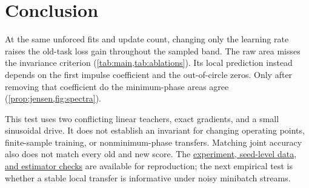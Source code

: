 \section{Conclusion}

At the same unforced fits and update count, changing only the learning rate raises the old-task loss gain throughout the sampled band. The raw area misses the invariance criterion (\cref{tab:main,tab:ablations}). Its local prediction instead depends on the first impulse coefficient and the out-of-circle zeros. Only after removing that coefficient do the minimum-phase areas agree (\cref{prop:jensen,fig:spectra}).

This test uses two conflicting linear teachers, exact gradients, and a small sinusoidal drive. It does not establish an invariant for changing operating points, finite-sample training, or nonminimum-phase transfers. Matching joint accuracy also does not match every old and new score. The \href{https://github.com/manojbajaj95/cl/tree/f018cf8/experiments/waterbed}{experiment, seed-level data, and estimator checks} are available for reproduction; the next empirical test is whether a stable local transfer is informative under noisy minibatch streams.
